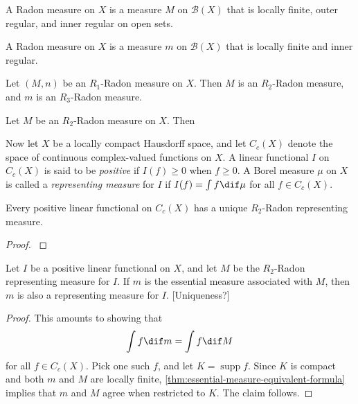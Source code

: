\documentclass[article, a4paper, 11pt, oneside]{memoir}
\numberwithin{equation}{chapter}
\newcommand{\calB}{\mathcal{B}}
\newcommand{\borel}[1]{\calB(#1)}
\DeclareMathOperator{\supp}{supp}
\begin{document}
\begin{definition}
    A Radon measure on $X$ is a measure $M$ on $\borel{X}$ that is locally finite, outer regular, and inner regular on open sets.
\end{definition}

\begin{definition}
    A Radon measure on $X$ is a measure $m$ on $\borel{X}$ that is locally finite and inner regular.
\end{definition}


\begin{theorem}
    \begin{enumthm}
        \item Let $(M,n)$ be an $R_1$-Radon measure on $X$. Then $M$ is an $R_2$-Radon measure, and $m$ is an $R_3$-Radon measure.

        \item Let $M$ be an $R_2$-Radon measure on $X$. Then 
    \end{enumthm}
\end{theorem}


Now let $X$ be a locally compact Hausdorff space, and let $C_c(X)$ denote the space of continuous complex-valued functions on $X$. A linear functional $I$ on $C_c(X)$ is said to be \emph{positive} if $I(f) \geq 0$ when $f \geq 0$. A Borel measure $\mu$ on $X$ is called a \emph{representing measure} for $I$ if $I(f) = \int f \dif\mu$ for all $f \in C_c(X)$.

\begin{theorem}
    Every positive linear functional on $C_c(X)$ has a unique $R_2$-Radon representing measure.
\end{theorem}

\begin{proof}
    \textcite[Theorem~7.2]{folland2007}
\end{proof}

\begin{proposition}
    Let $I$ be a positive linear functional on $X$, and let $M$ be the $R_2$-Radon representing measure for $I$. If $m$ is the essential measure associated with $M$, then $m$ is also a representing measure for $I$. [Uniqueness?]
\end{proposition}

\begin{proof}
    This amounts to showing that
    \begin{equation*}
        \int f \dif m = \int f \dif M
    \end{equation*}
    for all $f \in C_c(X)$. Pick one such $f$, and let $K = \supp f$. Since $K$ is compact and both $m$ and $M$ are locally finite, \cref{thm:essential-measure-equivalent-formula} implies that $m$ and $M$ agree when restricted to $K$. The claim follows.
\end{proof}



\nocite{*}

\printbibliography
\end{document}
